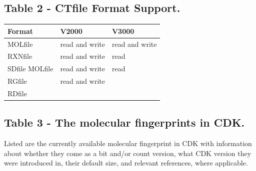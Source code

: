 \documentclass[10pt]{bmcart}
\begin{document}
\begin{backmatter}
      \subsection*{Table 2 - CTfile Format Support.}\label{tab:ctfileFormats}

    \begin{minipage}{1\textwidth}
    \renewcommand*{\thempfootnote}{\fnsymbol{mpfootnote}}
    \centering
    \begin{tabular}{lll}
  \textbf{Format}            & \textbf{V2000}  & \textbf{V3000} \\ \hline
    MOLfile & read and write & read and write \\
    RXNfile & read and write & read \\
    SDfile MOLfile & read and write & read \\ %
    RGfile & read and write & \\
    RDfile & & \\ %
    \end{tabular}
    \end{minipage}


  \subsection*{Table 3 - The molecular fingerprints in CDK.}
  \label{tab:fingerprints}
  Listed are the currently available molecular fingerprint in CDK with
  information about whether they come as a bit and/or count version, what CDK version
  they were introduced in, their default size, and relevant
  references, where applicable.
  \baselineskip


\end{backmatter}
\end{document}

